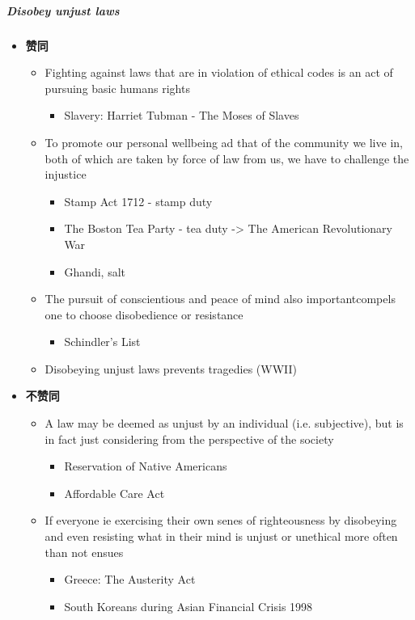   \subparagraph{Disobey unjust laws}

  \begin{itemize}
    \item \textbf{赞同}
    \begin{itemize}
      \item Fighting against laws that are in violation of ethical codes
      is an act of pursuing basic humans rights
      \begin{itemize}
        \item Slavery: Harriet Tubman - The Moses of Slaves
      \end{itemize}

      \item To promote our personal wellbeing ad that of the community we
      live in, both of which are taken by force of law from us, we have to
      challenge the injustice
      \begin{itemize}
        \item Stamp Act 1712 - stamp duty
        \item The Boston Tea Party - tea duty -> The American
        Revolutionary War
        \item Ghandi, salt
      \end{itemize}

      \item The pursuit of conscientious and peace of mind also
      important{compels one to choose disobedience or resistance}
      \begin{itemize}
        \item Schindler’s List
      \end{itemize}

      \item Disobeying unjust laws prevents tragedies (WWII)
    \end{itemize}

    \item \textbf{不赞同}
    \begin{itemize}
      \item A law may be deemed as unjust by an individual
      (i.e. subjective), but is in fact just considering from the
      perspective of the society
      \begin{itemize}
        \item Reservation of Native Americans
        \item Affordable Care Act
      \end{itemize}

      \item If everyone ie exercising their own senes of righteousness by
      disobeying and even resisting what in their mind is unjust or
      unethical  more often than not ensues
      \begin{itemize}
        \item Greece: The Austerity Act
        \item South Koreans during Asian Financial Crisis 1998
      \end{itemize}


\end{itemize}
\end{itemize}
